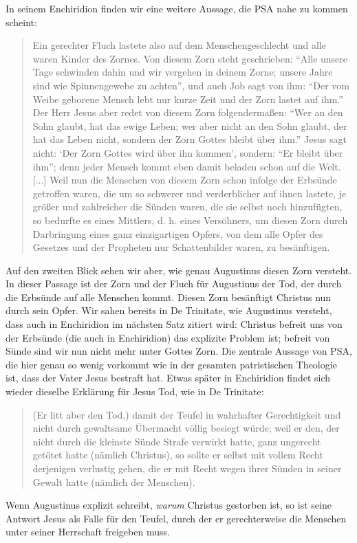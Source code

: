 In seinem Enchiridion finden wir eine weitere Aussage, die PSA nahe zu kommen scheint:
\begin{quote}
	Ein gerechter Fluch lastete also auf dem Menschengeschlecht und alle waren Kinder des Zornes.
	Von diesem Zorn steht geschrieben: ``Alle unsere Tage schwinden dahin und wir vergehen in deinem Zorne; unsere Jahre sind wie Spinnengewebe zu achten'',
	und auch Job sagt von ihm: ``Der vom Weibe geborene Mensch lebt nur kurze Zeit und der Zorn lastet auf ihm.''
	Der Herr Jesus aber redet von diesem Zorn folgendermaßen:
	``Wer an den Sohn glaubt, hat das ewige Leben; wer aber nicht an den Sohn glaubt, der hat das Leben nicht, sondern der Zorn Gottes bleibt über ihm.''
	Jesus sagt nicht: `Der Zorn Gottes wird über ihn kommen', sondern: ``Er bleibt über ihm''; denn jeder Mensch kommt eben damit beladen schon auf die Welt.
	[...]
	Weil nun die Menschen von diesem Zorn schon infolge der Erbsünde getroffen waren, die um so schwerer und verderblicher auf ihnen lastete,
	je größer und zahlreicher die Sünden waren, die sie selbst noch hinzufügten, so bedurfte es eines Mittlers, d. h. eines Versöhners,
	um diesen Zorn durch Darbringung eines ganz einzigartigen Opfers, von dem alle Opfer des Gesetzes und der Propheten nur Schattenbilder waren, zu besänftigen.
\end{quote}
Auf den zweiten Blick sehen wir aber, wie genau Augustinus diesen Zorn versteht.
In dieser Passage ist der Zorn und der Fluch für Augustinus der Tod, der durch die Erbsünde auf alle Menschen kommt.
Diesen Zorn besänftigt Christus nun durch sein Opfer.
Wir sahen bereits in De Trinitate, wie Augustinus  versteht, dass auch in Enchiridion im nächsten Satz zitiert wird:
Christus befreit uns von der Erbsünde (die auch in Enchiridion) das explizite Problem ist; befreit von Sünde sind wir nun nicht mehr unter Gottes Zorn.
Die zentrale Aussage von PSA, die hier genau so wenig vorkommt wie in der gesamten patristischen Theologie ist, dass der Vater Jesus bestraft hat.
Etwas später in Enchiridion findet sich wieder dieselbe Erklärung für Jesus Tod, wie in De Trinitate:
\begin{quote}
	(Er litt aber den Tod,) damit der Teufel in wahrhafter Gerechtigkeit und nicht durch gewaltsame Übermacht völlig besiegt würde;
	weil er den, der nicht durch die kleinste Sünde Strafe verwirkt hatte, ganz ungerecht getötet hatte (nämlich Christus),
	so sollte er selbst mit vollem Recht derjenigen verlustig gehen, die er mit Recht wegen ihrer Sünden in seiner Gewalt hatte (nämlich der Menschen).
\end{quote}
Wenn Augustinus explizit schreibt, \textit{warum} Christus gestorben ist, so ist seine Antwort Jesus als Falle für den Teufel, durch der er gerechterweise die Menschen unter seiner
Herrschaft freigeben muss.


